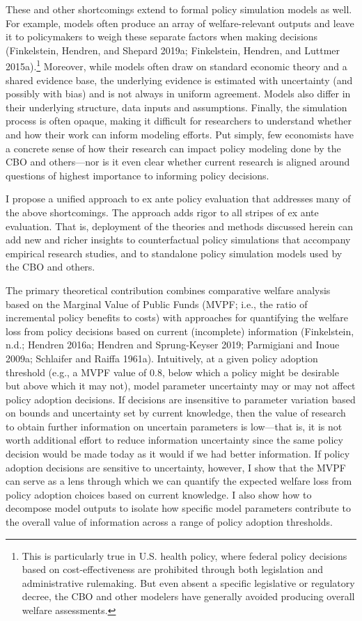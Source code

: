 \documentclass[
  10pt,
]{article}
\begin{document}
These and other shortcomings extend to formal policy simulation models
as well. For example, models often produce an array of welfare-relevant
outputs and leave it to policymakers to weigh these separate factors
when making decisions (Finkelstein, Hendren, and Shepard 2019a;
Finkelstein, Hendren, and Luttmer 2015a).\footnote{This is particularly
  true in U.S. health policy, where federal policy decisions based on
  cost-effectiveness are prohibited through both legislation and
  administrative rulemaking. But even absent a specific legislative or
  regulatory decree, the CBO and other modelers have generally avoided
  producing overall welfare assessments.} Moreover, while models often
draw on standard economic theory and a shared evidence base, the
underlying evidence is estimated with uncertainty (and possibly with
bias) and is not always in uniform agreement. Models also differ in
their underlying structure, data inputs and assumptions. Finally, the
simulation process is often opaque, making it difficult for researchers
to understand whether and how their work can inform modeling efforts.
Put simply, few economists have a concrete sense of how their research
can impact policy modeling done by the CBO and others---nor is it even
clear whether current research is aligned around questions of highest
importance to informing policy decisions.

I propose a unified approach to ex ante policy evaluation that addresses
many of the above shortcomings. The approach adds rigor to all stripes
of ex ante evaluation. That is, deployment of the theories and methods
discussed herein can add new and richer insights to counterfactual
policy simulations that accompany empirical research studies, and to
standalone policy simulation models used by the CBO and others.

The primary theoretical contribution combines comparative welfare
analysis based on the Marginal Value of Public Funds (MVPF; i.e., the
ratio of incremental policy benefits to costs) with approaches for
quantifying the welfare loss from policy decisions based on current
(incomplete) information (Finkelstein, n.d.; Hendren 2016a; Hendren and
Sprung-Keyser 2019; Parmigiani and Inoue 2009a; Schlaifer and Raiffa
1961a). Intuitively, at a given policy adoption threshold (e.g., a MVPF
value of 0.8, below which a policy might be desirable but above which it
may not), model parameter uncertainty may or may not affect policy
adoption decisions. If decisions are insensitive to parameter variation
based on bounds and uncertainty set by current knowledge, then the value
of research to obtain further information on uncertain parameters is
low---that is, it is not worth additional effort to reduce information
uncertainty since the same policy decision would be made today as it
would if we had better information. If policy adoption decisions are
sensitive to uncertainty, however, I show that the MVPF can serve as a
lens through which we can quantify the expected welfare loss from policy
adoption choices based on current knowledge. I also show how to
decompose model outputs to isolate how specific model parameters
contribute to the overall value of information across a range of policy
adoption thresholds.
\end{document}
